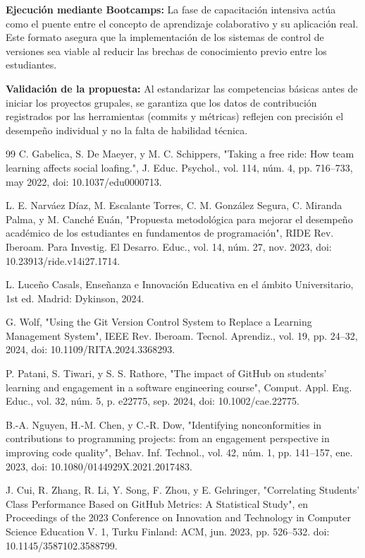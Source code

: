 \documentclass[12pt,a4paper]{article}
\begin{document}
\textbf{Ejecución mediante Bootcamps:} La fase de capacitación intensiva actúa como el puente entre el concepto de aprendizaje colaborativo y su aplicación real. Este formato asegura que la implementación de los sistemas de control de versiones sea viable al reducir las brechas de conocimiento previo entre los estudiantes.\cite{ortiz2024}

\textbf{Validación de la propuesta:} Al estandarizar las competencias básicas antes de iniciar los proyectos grupales, se garantiza que los datos de contribución registrados por las herramientas (commits y métricas) reflejen con precisión el desempeño individual y no la falta de habilidad técnica.\cite{ortiz2024}

\begin{thebibliography}{99}
 C. Gabelica, S. De Maeyer, y M. C. Schippers, "Taking a free ride: How team learning affects social loafing.", J. Educ. Psychol., vol. 114, núm. 4, pp. 716–733, may 2022, doi: 10.1037/edu0000713.

 L. E. Narváez Díaz, M. Escalante Torres, C. M. González Segura, C. Miranda Palma, y M. Canché Euán, "Propuesta metodológica para mejorar el desempeño académico de los estudiantes en fundamentos de programación", RIDE Rev. Iberoam. Para Investig. El Desarro. Educ., vol. 14, núm. 27, nov. 2023, doi: 10.23913/ride.v14i27.1714.

 L. Luceño Casals, Enseñanza e Innovación Educativa en el ámbito Universitario, 1st ed. Madrid: Dykinson, 2024.

 G. Wolf, "Using the Git Version Control System to Replace a Learning Management System", IEEE Rev. Iberoam. Tecnol. Aprendiz., vol. 19, pp. 24–32, 2024, doi: 10.1109/RITA.2024.3368293.

 P. Patani, S. Tiwari, y S. S. Rathore, "The impact of GitHub on students' learning and engagement in a software engineering course", Comput. Appl. Eng. Educ., vol. 32, núm. 5, p. e22775, sep. 2024, doi: 10.1002/cae.22775.

 B.-A. Nguyen, H.-M. Chen, y C.-R. Dow, "Identifying nonconformities in contributions to programming projects: from an engagement perspective in improving code quality", Behav. Inf. Technol., vol. 42, núm. 1, pp. 141–157, ene. 2023, doi: 10.1080/0144929X.2021.2017483.

 J. Cui, R. Zhang, R. Li, Y. Song, F. Zhou, y E. Gehringer, "Correlating Students' Class Performance Based on GitHub Metrics: A Statistical Study", en Proceedings of the 2023 Conference on Innovation and Technology in Computer Science Education V. 1, Turku Finland: ACM, jun. 2023, pp. 526–532. doi: 10.1145/3587102.3588799.


\end{thebibliography}
\end{document}

